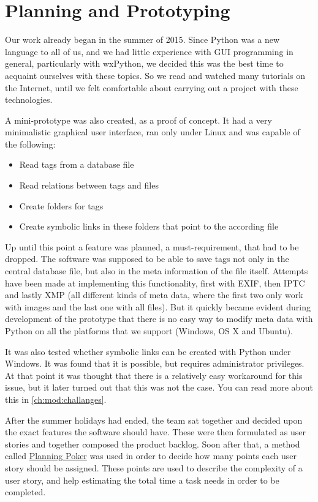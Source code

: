 \section{Planning and Prototyping} %
\def\kapitelautor{Erik Ritschl}

Our work already began in the summer of 2015. Since Python was a new language
to all of us, and we had little experience with GUI programming in general,
particularly with wxPython, we decided this was the best time
to acquaint ourselves with these topics. So we read and watched many tutorials
on the Internet, until we felt comfortable about carrying out a project with
these technologies.

A mini-prototype was also created, as a proof of concept. It had a very
minimalistic graphical user interface, ran only under Linux and was capable of
the following:

\begin{itemize}
	\item Read tags from a database file
	\item Read relations between tags and files
	\item Create folders for tags
	\item Create symbolic links in these folders that point to the according file
\end{itemize}

Up until this point a feature was planned, a must-requirement, that had to be
dropped. The software was supposed to be able to save tags not only in the
central database file, but also in the meta information of the file itself.
Attempts have been made at implementing this functionality, first with EXIF,
then IPTC and lastly XMP (all different kinds of meta data, where the first two
only work with images and the last one with all files). But it quickly became
evident during development of the prototype that there is no easy way to modify
meta data with Python on all the platforms that we support (Windows, OS X and
Ubuntu).

It was also tested whether symbolic links can be created with Python under
Windows. It was found that it is possible, but requires administrator
privileges. At that point it was thought that there is a relatively easy
workaround for this issue, but it later turned out that this was not the case.
You can read more about this in \cref{ch:mod:challanges}.

After the summer holidays had ended, the team sat together and decided upon the
exact features the software should have. These were then formulated as user
stories and together composed the product backlog. Soon after that, a method
called \href{https://en.wikipedia.org/wiki/Planning_poker}{Planning Poker} was
used in order to decide how many points each user story should be assigned.
These points are used to describe the complexity of a user story, and help
estimating the total time a task needs in order to be completed.

